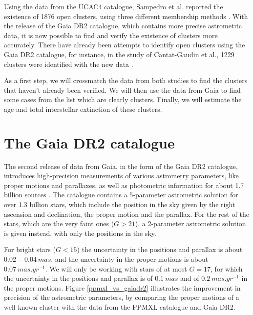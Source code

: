 \documentclass[twocolumn]{revtex4}
\begin{document}
Using the data from the UCAC4 catalogue, Sampedro et al. reported the existence of 1876 open clusters, using three different membership methods \cite{sampedro}. With the release of the Gaia DR2 catalogue, which contains more precise astrometric data, it is now possible to find and verify the existence of clusters more accurately.
There have already been attempts to identify open clusters using the Gaia DR2 catalogue, for instance, in the study of Cantat-Gaudin et al., 1229 clusters were identified with the new data \cite{cantat-gaudin}.

As a first step, we will crossmatch the data from both studies to find the clusters that haven't already been verified. We will then use the data from Gaia to find some cases from the list which are clearly clusters. Finally, we will estimate the age and total interstellar extinction of these clusters.

\section{The Gaia DR2 catalogue}
The second release of data from Gaia, in the form of the Gaia DR2 catalogue, introduces high-precision measurements of various astrometry parameters, like proper motions and parallaxes, as well as photometric information for about 1.7 billion sources \cite{gaiadr2}. The catalogue contains a 5-parameter astrometric solution for over 1.3 billion stars, which include the position in the sky given by the right ascension and declination, the proper motion and the parallax. For the rest of the stars, which are the very faint ones ($G > 21$), a 2-parameter astrometric solution is given instead, with only the positions in the sky.

For bright stars ($G < 15$) the uncertainty in the positions and parallax is about $0.02-0.04\ \si{mas}$, and the uncertainty in the proper motions is about $0.07\ \si{mas.yr^{-1}}$. We will only be working with stars of at most $G = 17$, for which the uncertainty in the positions and parallax is of $0.1\ \si{mas}$ and of $0.2\ \si{mas.yr^{-1}}$ in the proper motions. Figure \ref{ppmxl_vs_gaiadr2} illustrates the improvement in precision of the astrometric parameters, by comparing the proper motions of a well known cluster with the data from the PPMXL catalogue \cite{ppmxl} and Gaia DR2.
\end{document}
